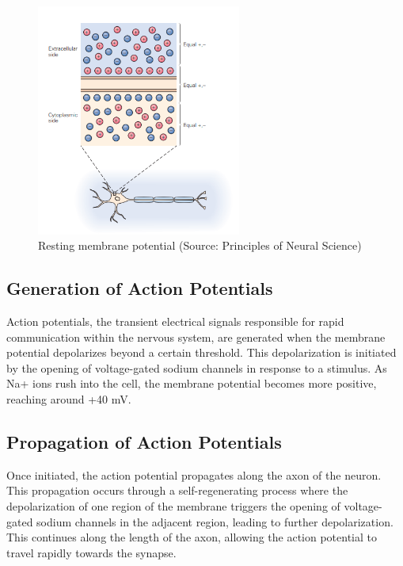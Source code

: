 \documentclass[12pt,a4paper]{report}
\begin{document}
\begin{figure}[htbp]
    \centering
    \includegraphics[width=0.6\textwidth]{./data/resting_membrane_potential.png}
    \caption{Resting membrane potential (Source: Principles of Neural Science\cite{principles_of_neural_science})}
    \label{fig:resting_membrane_potential}
\end{figure}

\subsection{Generation of Action Potentials}

Action potentials, the transient electrical signals responsible for rapid communication within the nervous system, are generated when the membrane potential depolarizes beyond a certain threshold. This depolarization is initiated by the opening of voltage-gated sodium channels in response to a stimulus. As Na+ ions rush into the cell, the membrane potential becomes more positive, reaching around +40 mV.

\subsection{Propagation of Action Potentials}

Once initiated, the action potential propagates along the axon of the neuron. This propagation occurs through a self-regenerating process where the depolarization of one region of the membrane triggers the opening of voltage-gated sodium channels in the adjacent region, leading to further depolarization. This continues along the length of the axon, allowing the action potential to travel rapidly towards the synapse.
\end{document}
